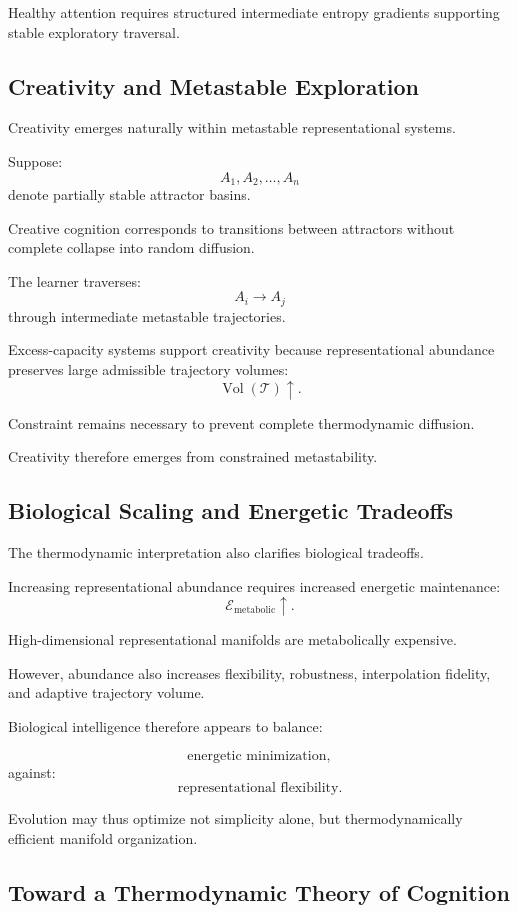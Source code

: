 \documentclass[12pt,a4paper]{article}
\begin{document}
Healthy attention requires structured intermediate entropy gradients supporting stable exploratory traversal.

\subsection{Creativity and Metastable Exploration}

Creativity emerges naturally within metastable representational systems.

Suppose:
\[
A_1,A_2,\ldots,A_n
\]
denote partially stable attractor basins.

Creative cognition corresponds to transitions between attractors without complete collapse into random diffusion.

The learner traverses:
\[
A_i
\rightarrow
A_j
\]
through intermediate metastable trajectories.

Excess-capacity systems support creativity because representational abundance preserves large admissible trajectory volumes:
\[
\operatorname{Vol}
(
\mathcal{T}
)
\uparrow.
\]

Constraint remains necessary to prevent complete thermodynamic diffusion.

Creativity therefore emerges from constrained metastability.

\subsection{Biological Scaling and Energetic Tradeoffs}

The thermodynamic interpretation also clarifies biological tradeoffs.

Increasing representational abundance requires increased energetic maintenance:
\[
\mathcal{E}_{\text{metabolic}}
\uparrow.
\]

High-dimensional representational manifolds are metabolically expensive.

However, abundance also increases flexibility, robustness, interpolation fidelity, and adaptive trajectory volume.

Biological intelligence therefore appears to balance:

\[
\text{energetic minimization},
\]
against:
\[
\text{representational flexibility}.
\]

Evolution may thus optimize not simplicity alone, but thermodynamically efficient manifold organization.

\subsection{Toward a Thermodynamic Theory of Cognition}
\end{document}
